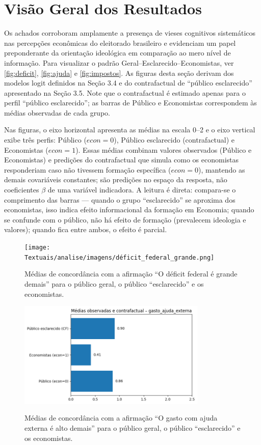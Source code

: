 \chapter{Visão Geral dos Resultados}
Os achados corroboram amplamente a presença de vieses cognitivos sistemáticos nas percepções econômicas do eleitorado brasileiro e evidenciam um papel preponderante da orientação ideológica em comparação ao mero nível de informação. Para visualizar o padrão Geral–Esclarecido–Economistas, ver \autoref{fig:deficit}, \autoref{fig:ajuda} e \autoref{fig:impostos}. As figuras desta seção derivam dos modelos logit definidos na Seção 3.4 e do contrafactual de “público esclarecido” apresentado na Seção 3.5. Note que o contrafactual é estimado apenas para o perfil “público esclarecido”; as barras de Público e Economistas correspondem às médias observadas de cada grupo.

Nas figuras, o eixo horizontal apresenta as médias na escala 0–2 e o eixo vertical exibe três perfis: Público ($\textit{econ}=0$), Público esclarecido (contrafactual) e Economistas ($\textit{econ}=1$). Essas médias combinam valores observados (Público e Economistas) e predições do contrafactual que simula como os economistas responderiam caso não tivessem formação específica ($\textit{econ}=0$), mantendo as demais covariáveis constantes; são predições no espaço da resposta, não coeficientes $\beta$ de uma variável indicadora. A leitura é direta: compara-se o comprimento das barras — quando o grupo “esclarecido” se aproxima dos economistas, isso indica efeito informacional da formação em Economia; quando se confunde com o público, não há efeito de formação (prevalecem ideologia e valores); quando fica entre ambos, o efeito é parcial.


\begin{figure}[htbp]
\centering
\caption{Médias de concordância com a afirmação ``O déficit federal é grande demais'' para o público geral, o público ``esclarecido'' e os economistas.}
\texttt{[image: Textuais/analise/imagens/déficit\_federal\_grande.png]}
\notafig
\label{fig:deficit}
\end{figure}

\begin{figure}[htbp]
\centering
\caption{Médias de concordância com a afirmação ``O gasto com ajuda externa é alto demais'' para o público geral, o público ``esclarecido'' e os economistas.}
\includegraphics[width=0.8\textwidth]{Textuais/analise/imagens/gasto_ajuda_externa.png}
\notafig
\label{fig:ajuda}
\end{figure}

